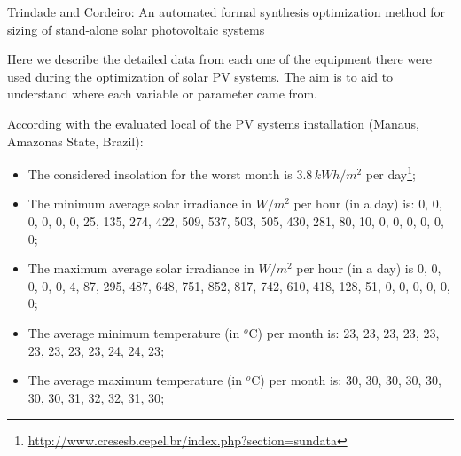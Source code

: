 \documentclass[journal,onecolumn]{IEEEtran}
\begin{document}
%
{Trindade and Cordeiro: An automated formal synthesis optimization method for sizing of stand-alone solar photovoltaic systems}
% 


\maketitle

Here we describe the detailed data from each one of the equipment there were used during the optimization of solar PV systems. The aim is to aid to understand where each variable or parameter came from.

According with the evaluated local of the PV systems installation (Manaus, Amazonas State, Brazil):

\begin{itemize}
 \item The considered insolation for the worst month is $3.8 \, kWh/m^{2}$ per day\footnote{\url{http://www.cresesb.cepel.br/index.php?section=sundata}};
 \item The minimum average solar irradiance in $W/m^{2}$ per hour (in a day) is:  {0, 0, 0, 0, 0, 0, 25, 135, 274, 422, 509, 537, 503, 505, 430, 281, 80, 10, 0, 0, 0, 0, 0, 0};
 \item The maximum average solar irradiance in $W/m^{2}$ per hour (in a day) is {0, 0, 0, 0, 0, 4, 87, 295, 487, 648, 751, 852, 817, 742, 610, 418, 128, 51, 0, 0, 0, 0, 0, 0};
 \item The average minimum temperature (in $^{o}$C) per month is: {23, 23, 23, 23, 23, 23, 23, 23, 23, 24, 24, 23};
 \item The average maximum temperature (in $^{o}$C) per month is: {30, 30, 30, 30, 30, 30, 30, 31, 32, 32, 31, 30};
\end{itemize} 
\end{document}
